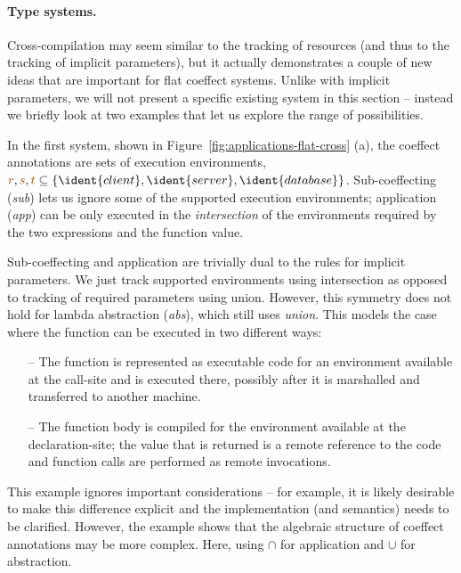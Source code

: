 \paragraph{Type systems.}

Cross-compilation may seem similar to the tracking of resources (and thus to the tracking of implicit 
parameters), but it actually demonstrates a couple of new ideas that are important for flat coeffect 
systems. Unlike with implicit parameters, we will not present a specific existing system in this 
section -- instead we briefly look at two examples that let us explore the range of possibilities. 

In the first system, shown in Figure~\ref{fig:applications-flat-cross} (a), the coeffect annotations
are sets of execution environments, \ie~$\aclrd{r}, \aclrd{s}, \aclrd{t} \subseteq \{ \ident{client},
\ident{server}, \ident{database} \}$. Sub-coeffecting (\emph{sub}) lets us ignore some of the supported 
execution environments; application (\emph{app}) can be only executed in the \emph{intersection} of the
environments required by the two expressions and the function value.

Sub-coeffecting and application are trivially dual to the rules for implicit parameters. We just track
supported environments using intersection as opposed to tracking of required parameters using union.
However, this symmetry does not hold for lambda abstraction (\emph{abs}), which still uses \emph{union}.
This models the case where the function can be executed in two different ways:
%
\begin{itemize}
\item[--] The function is represented as executable code for an environment available at the call-site
  and is executed there, possibly after it is marshalled and transferred to another machine.
\vspace{-0.5em}
\item[--] The function body is compiled for the environment available at the declaration-site; the value
  that is returned is a remote reference to the code and function calls are performed as remote invocations.
\end{itemize}
%
This example ignores important considerations -- for example, it is likely desirable to make this
difference explicit and the implementation (and semantics) needs to be clarified. However, the
example shows that the algebraic structure of coeffect annotations may be more complex. Here, using
$\cap$ for application and $\cup$ for abstraction.

